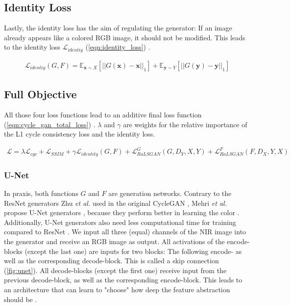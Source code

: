 \documentclass[a4paper,11pt, DIV=12]{scrartcl}
\newcommand{\x}{\boldsymbol{x}}
\newcommand{\y}{\boldsymbol{y}}
\begin{document}
\subsection*{Identity Loss}
Lastly, the identity loss has the aim of regulating the generator:
If an image already appears like a colored RGB image, it should not be modified.
This leads to the identity loss $\mathcal{L}_{identiy}$ (\autoref{eqn:identity_loss}) \cite{mehri2019colorizing}.

\begin{equation}
   \label{eqn:identity_loss}
   \begin{aligned}
      \mathcal{L}_{identiy}(G, F) = \mathbb{E}_{\x \sim X} \left[||G(\x) - \x||_1\right] + \mathbb{E}_{\y \sim Y} \left[||G(\y) - \y||_1\right]
   \end{aligned}
\end{equation}

\subsection*{Full Objective}
All those four loss functions lead to an additive final loss function (\autoref{eqn:cycle_gan_total_loss}) \cite{mehri2019colorizing}.
$\lambda$ and $\gamma$ are weights for the relative importance of the L1 cycle consistency loss and the identity loss.

\begin{equation}
   \label{eqn:cycle_gan_total_loss}
   \begin{aligned}
      \mathcal{L} = \lambda \mathcal{L}_{cyc} + \mathcal{L}_{SSIM} + \gamma \mathcal{L}_{identity}(G,F) + \mathcal{L}_{RaLSGAN}^G(G,D_Y,X,Y) + \mathcal{L}_{RaLSGAN}^F(F,D_X,Y,X)
   \end{aligned}
\end{equation}

\subsubsection*{U-Net}
In praxis, both functions $G$ and $F$ are generation networks. Contrary to the ResNet generators \cite{resnet} Zhu \textit{et al.} used in the original CycleGAN \cite{cyclegan_orig},
Mehri \textit{et al.} propose U-Net generators \cite{unet}, because they perform better in learning the color \cite{mehri2019colorizing}.
Additionally, U-Net generators also need less computational time for training compared to ResNet \cite{mehri2019colorizing}.
We input all three (equal) channels of the NIR image into the generator and receive an RGB image as output.
All activations of the encode-blocks (except the last one) are inputs for two blocks:
The following encode- as well as the corresponding decode-block. This is called a skip connection \cite{unet} (\autoref{fig:unet}).
All decode-blocks (except the first one) receive input from the previous decode-block, as well as the corresponding encode-block.
This leads to an architecture that can learn to "choose" how deep the feature abstraction should be \cite{unet}.
\end{document}

